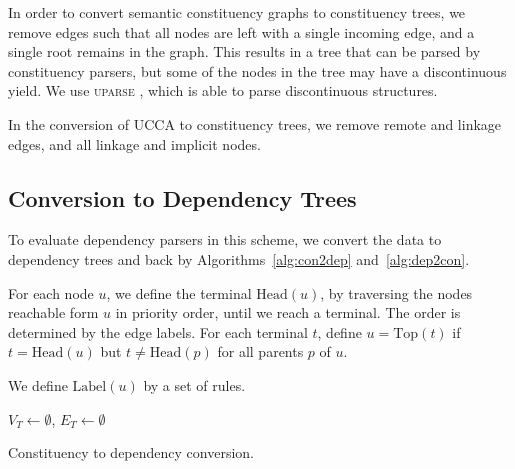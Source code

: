 \documentclass[11pt]{article}
\begin{document}
In order to convert semantic constituency graphs to constituency trees, we remove edges such that all nodes are left with a single incoming edge, and a single root remains in the graph. This results in a tree that can be parsed by constituency parsers, but some of the nodes in the tree may have a discontinuous yield. We use \textsc{uparse} \cite{maier2015discontinuous}, which is able to parse discontinuous structures.

In the conversion of UCCA to constituency trees, we remove remote and linkage edges, and all linkage and implicit nodes.


\subsection{Conversion to Dependency Trees}
\label{subsec:con2dep}

To evaluate dependency parsers in this scheme, we convert the data to dependency trees and back by Algorithms~\ref{alg:con2dep} and~\ref{alg:dep2con}.

For each node $u$, we define the terminal $\mathrm{Head}(u)$, by traversing the nodes reachable form $u$ in priority order, until we reach a terminal. The order is determined by the edge labels. For each terminal $t$, define $u=\mathrm{Top}(t)$ if $t=\mathrm{Head}(u)$ but $t\neq \mathrm{Head}(p)$ for all parents $p$ of $u$.

We define $\mathrm{Label}(u)$ by a set of rules.

\begin{algorithm}[t]
 $V_T \leftarrow \emptyset$,
 $E_T \leftarrow \emptyset$\\
 \caption{Constituency to dependency conversion.}
 \label{alg:con2dep}
\end{algorithm}
\end{document}
